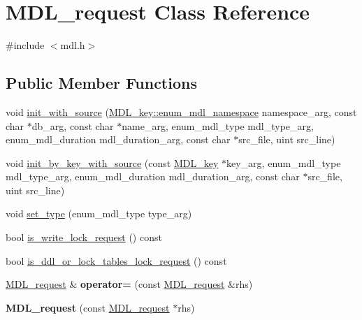 \hypertarget{classMDL__request}{}\section{M\+D\+L\+\_\+request Class Reference}
\label{classMDL__request}


{\ttfamily \#include $<$mdl.\+h$>$}

\subsection*{Public Member Functions}
\begin{DoxyCompactItemize}
\item 
void \mbox{\hyperlink{classMDL__request_ab04208d9a63353d65b5384b2352657ea}{init\+\_\+with\+\_\+source}} (\mbox{\hyperlink{structMDL__key_a391ec4bd98fec6852a48f7856546ed3b}{M\+D\+L\+\_\+key\+::enum\+\_\+mdl\+\_\+namespace}} namespace\+\_\+arg, const char $\ast$db\+\_\+arg, const char $\ast$name\+\_\+arg, enum\+\_\+mdl\+\_\+type mdl\+\_\+type\+\_\+arg, enum\+\_\+mdl\+\_\+duration mdl\+\_\+duration\+\_\+arg, const char $\ast$src\+\_\+file, uint src\+\_\+line)
\item 
void \mbox{\hyperlink{classMDL__request_a4e16a57d0955ac62887ff87d46dee5ad}{init\+\_\+by\+\_\+key\+\_\+with\+\_\+source}} (const \mbox{\hyperlink{structMDL__key}{M\+D\+L\+\_\+key}} $\ast$key\+\_\+arg, enum\+\_\+mdl\+\_\+type mdl\+\_\+type\+\_\+arg, enum\+\_\+mdl\+\_\+duration mdl\+\_\+duration\+\_\+arg, const char $\ast$src\+\_\+file, uint src\+\_\+line)
\item 
void \mbox{\hyperlink{classMDL__request_a6cc77971b2b370098d3e6d89f816180e}{set\+\_\+type}} (enum\+\_\+mdl\+\_\+type type\+\_\+arg)
\item 
bool \mbox{\hyperlink{classMDL__request_a2eba1fb8ec80fc083ddee0b45c683294}{is\+\_\+write\+\_\+lock\+\_\+request}} () const
\item 
bool \mbox{\hyperlink{classMDL__request_a0464ab737f8f687f27626d2595a7125a}{is\+\_\+ddl\+\_\+or\+\_\+lock\+\_\+tables\+\_\+lock\+\_\+request}} () const
\item 
\mbox{\label{classMDL__request_ae00606a0fc45f65d897307baaa4773c0}} 
\mbox{\hyperlink{classMDL__request}{M\+D\+L\+\_\+request}} \& {\bfseries operator=} (const \mbox{\hyperlink{classMDL__request}{M\+D\+L\+\_\+request}} \&rhs)
\item 
\mbox{\label{classMDL__request_a4899c84cffa559f5490ec0bfb9e9929f}} 
{\bfseries M\+D\+L\+\_\+request} (const \mbox{\hyperlink{classMDL__request}{M\+D\+L\+\_\+request}} $\ast$rhs)
\end{DoxyCompactItemize}
